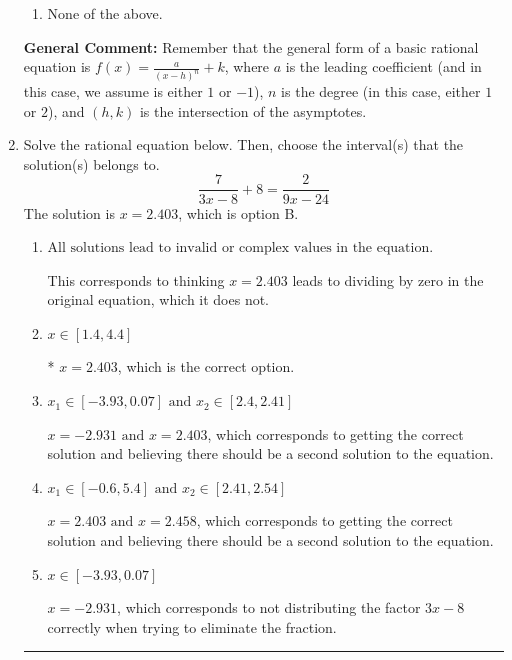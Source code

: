 \documentclass{extbook}[14pt]
\newcommand{\litem}[1]{\item #1

\rule{\textwidth}{0.4pt}}
\begin{document}
\begin{enumerate}
{\begin{enumerate}[label=\Alph*.]
\begin{multicols}{2}
\end{multicols}\item None of the above.\end{enumerate}
\textbf{General Comment:} Remember that the general form of a basic rational equation is $ f(x) = \frac{a}{(x-h)^n} + k$, where $a$ is the leading coefficient (and in this case, we assume is either $1$ or $-1$), $n$ is the degree (in this case, either $1$ or $2$), and $(h, k)$ is the intersection of the asymptotes.
}
\litem{
Solve the rational equation below. Then, choose the interval(s) that the solution(s) belongs to.
\[ \frac{7}{3x -8} + 8 = \frac{2}{9x -24} \]The solution is \( x = 2.403 \), which is option B.\begin{enumerate}[label=\Alph*.]
\item \( \text{All solutions lead to invalid or complex values in the equation.} \)

This corresponds to thinking $x = 2.403$ leads to dividing by zero in the original equation, which it does not.
\item \( x \in [1.4,4.4] \)

* $x = 2.403$, which is the correct option.
\item \( x_1 \in [-3.93, 0.07] \text{ and } x_2 \in [2.4,2.41] \)

$x = -2.931 \text{ and } x = 2.403$, which corresponds to getting the correct solution and believing there should be a second solution to the equation.
\item \( x_1 \in [-0.6, 5.4] \text{ and } x_2 \in [2.41,2.54] \)

$x = 2.403 \text{ and } x = 2.458$, which corresponds to getting the correct solution and believing there should be a second solution to the equation.
\item \( x \in [-3.93,0.07] \)

$x = -2.931$, which corresponds to not distributing the factor $3x -8$ correctly when trying to eliminate the fraction.
\end{enumerate}

}
\end{enumerate}
\end{document}
